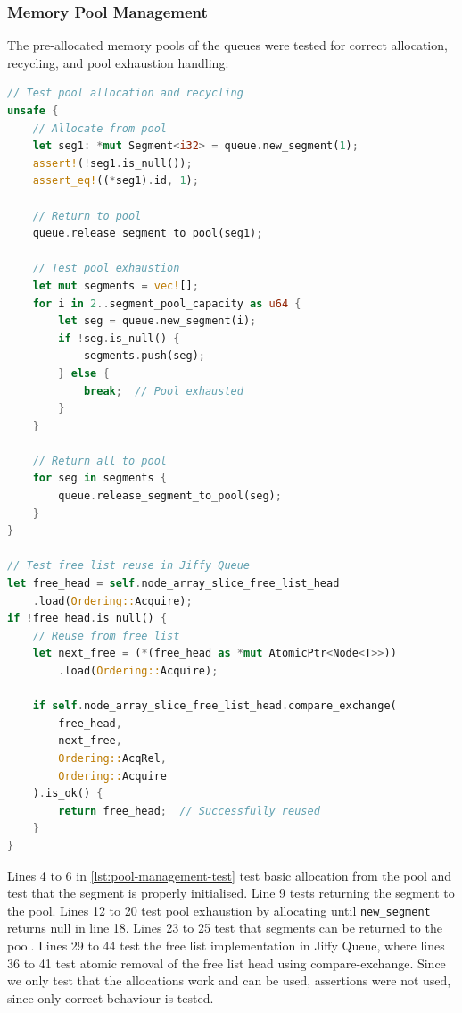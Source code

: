 \subsubsection{Memory Pool Management}
The pre-allocated memory pools of the queues were tested for correct allocation, recycling, and pool exhaustion handling:

\begin{lstlisting}[language=Rust, style=boxed, caption={Memory pool management test}, label={lst:pool-management-test}]
// Test pool allocation and recycling
unsafe {
    // Allocate from pool
    let seg1: *mut Segment<i32> = queue.new_segment(1);
    assert!(!seg1.is_null());
    assert_eq!((*seg1).id, 1);
    
    // Return to pool
    queue.release_segment_to_pool(seg1);
    
    // Test pool exhaustion
    let mut segments = vec![];
    for i in 2..segment_pool_capacity as u64 {
        let seg = queue.new_segment(i);
        if !seg.is_null() {
            segments.push(seg);
        } else {
            break;  // Pool exhausted
        }
    }
    
    // Return all to pool
    for seg in segments {
        queue.release_segment_to_pool(seg);
    }
}

// Test free list reuse in Jiffy Queue
let free_head = self.node_array_slice_free_list_head
    .load(Ordering::Acquire);
if !free_head.is_null() {
    // Reuse from free list
    let next_free = (*(free_head as *mut AtomicPtr<Node<T>>))
        .load(Ordering::Acquire);
        
    if self.node_array_slice_free_list_head.compare_exchange(
        free_head, 
        next_free, 
        Ordering::AcqRel, 
        Ordering::Acquire
    ).is_ok() {
        return free_head;  // Successfully reused
    }
}
\end{lstlisting}

Lines 4 to 6 in \cref{lst:pool-management-test} test basic allocation from the pool and test that the segment is properly initialised. Line 9 tests returning the segment to the pool. Lines 12 to 20 test pool exhaustion by allocating until \texttt{new\_segment} returns null in line 18. Lines 23 to 25 test that segments can be returned to the pool. Lines 29 to 44 test the free list implementation in Jiffy Queue, where lines 36 to 41 test atomic removal of the free list head using compare-exchange. Since we only test that the allocations work and can be used, assertions were not used, since only correct behaviour is tested.

